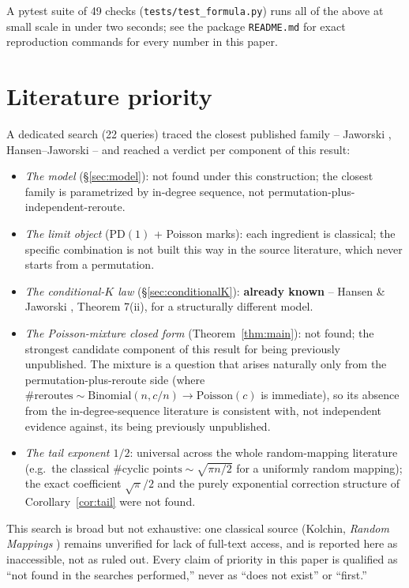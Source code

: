 \documentclass[11pt]{article}
\theoremstyle{remark}
\newcommand{\PD}{\mathrm{PD}}
\begin{document}
A pytest suite of 49 checks (\texttt{tests/test\_formula.py}) runs all
of the above at small scale in under two seconds; see the package
\texttt{README.md} for exact reproduction commands for every number in
this paper.

\section{Literature priority}
\label{sec:priority}

A dedicated search (22 queries) traced the closest published family --
Jaworski \cite{jaworski1984,jaworski1998},
Hansen--Jaworski \cite{hansenjaworski2002,hansenjaworski2006,hansenjaworski2008,hansenjaworski2014}
-- and reached a verdict per component of this result:

\begin{itemize}
\item \emph{The model} (\S\ref{sec:model}): not found under this
  construction; the closest family is parametrized by in-degree
  sequence, not permutation-plus-independent-reroute.
\item \emph{The limit object} ($\PD(1)$ + Poisson marks): each
  ingredient is classical; the specific combination is not built this
  way in the source literature, which never starts from a permutation.
\item \emph{The conditional-$K$ law} (\S\ref{sec:conditionalK}):
  \textbf{already known} -- Hansen \& Jaworski \cite{hansenjaworski2014},
  Theorem 7(ii), for a structurally different model.
\item \emph{The Poisson-mixture closed form} (Theorem~\ref{thm:main}):
  not found; the strongest candidate component of this result for being
  previously unpublished. The mixture is a question that arises
  naturally only from the permutation-plus-reroute side (where
  $\#\text{reroutes}\sim\mathrm{Binomial}(n,c/n)\to\mathrm{Poisson}(c)$
  is immediate), so its absence from the in-degree-sequence literature
  is consistent with, not independent evidence against, its being
  previously unpublished.
\item \emph{The tail exponent $1/2$}: universal across the whole
  random-mapping literature (e.g.\ the classical
  $\#\text{cyclic points}\sim\sqrt{\pi n/2}$ for a uniformly random
  mapping); the exact coefficient $\sqrt\pi/2$ and the purely
  exponential correction structure of Corollary~\ref{cor:tail} were not
  found.
\end{itemize}

This search is broad but not exhaustive: one classical source (Kolchin,
\emph{Random Mappings} \cite{kolchin1986}) remains unverified for lack
of full-text access, and is reported here as inaccessible, not as ruled
out. Every claim of priority in this paper is qualified as ``not found
in the searches performed,'' never as ``does not exist'' or ``first.''
\end{document}
